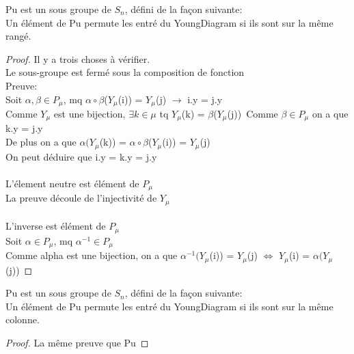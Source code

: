 \begin{definition}[Pu]
    \label{Pu}
    \leanok
    Pu est un sous groupe de $S_{n}$, défini de la façon suivante:\\
    Un élément de Pu permute les entré du YoungDiagram si ils sont sur la même rangé.
\end{definition}
\begin{proof}
    \leanok
    Il y a trois choses à vérifier.\\
    Le sous-groupe est fermé sous la composition de fonction\\
    Preuve:\\
    Soit $\alpha, \beta \in P_{\mu}$, mq $\alpha \circ \beta$($Y_{\mu}$(i)) = $Y_{\mu}$(j) $\to$ i.y = j.y\\
    Comme $Y_{\mu}$ est une bijection, $\exists k \in \mu$ tq $Y_{\mu}$(k) = $\beta$($Y_{\mu}$(j))\
    Comme $\beta \in P_{\mu}$ on a que k.y = j.y\\
    De plus on a que $\alpha (Y_{\mu}$(k)) = $\alpha \circ \beta$($Y_{\mu}$(i)) = $Y_{\mu}$(j)\\
    On peut déduire que i.y = k.y = j.y\\
    \\
    L'élement neutre est élément de $P_{\mu}$\\
    La preuve découle de l'injectivité de $Y_{\mu}$\\
    \\
    L'inverse est élément de $P_{\mu}$\\
    Soit $\alpha \in P_{\mu}$, mq $\alpha^{-1} \in P_{\mu}$\\
    Comme alpha est une bijection, on a que $\alpha^{-1} (Y_{\mu}$(i)) = $Y_{\mu}$(j) $\Leftrightarrow$ $Y_{\mu}$(i) = $\alpha (Y_{\mu}$(j))
\end{proof}

\begin{definition}[Qu]
    \label{Qu}
    \leanok
    Pu est un sous groupe de $S_{n}$, défini de la façon suivante:\\
    Un élément de Pu permute les entré du YoungDiagram si ils sont sur la même colonne.
\end{definition}
\begin{proof}
    \leanok
    La même preuve que Pu
\end{proof}

